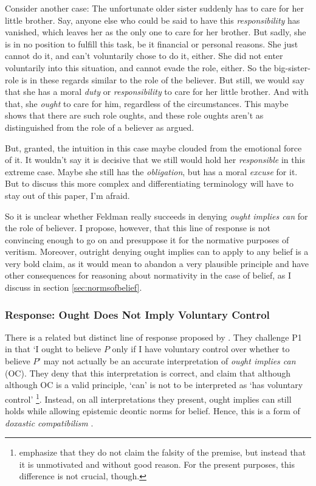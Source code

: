 \documentclass[12pt,numbers=noenddot]{scrartcl}
\begin{document}
Consider another case: The unfortunate older sister suddenly has to care for her little brother. Say, anyone else who could be said to have this \emph{responsibility} has vanished, which leaves her as the only one to care for her brother. But sadly, she is in no position to fulfill this task, be it financial or personal reasons. She just cannot do it, and can't voluntarily chose to do it, either. She did not enter voluntarily into this situation, and cannot evade the role, either. So the big-sister-role is in these regards similar to the role of the believer. But still, we would say that she has a moral \emph{duty} or \emph{responsibility} to care for her little brother. And with that, she \emph{ought} to care for him, regardless of the circumstances. This maybe shows that there are such role oughts, and these role oughts aren't as distinguished from the role of a believer as argued.

But, granted, the intuition in this case maybe clouded from the emotional force of it. It wouldn't say it is decisive that we still would hold her \emph{responsible} in this extreme case. Maybe she still has the \emph{obligation}, but has a moral \emph{excuse} for it. But to discuss this more complex and differentiating terminology will have to stay out of this paper, I'm afraid.

So it is unclear whether Feldman really succeeds in denying \emph{ought implies can} for the role of believer. I propose, however, that this line of response is not convincing enough to go on and presuppose it for the normative purposes of veritism. Moreover, outright denying ought implies can to apply to any belief is a very bold claim, as it would mean to abandon a very plausible principle and have other consequences for reasoning about normativity in the case of belief, as I discuss in section \ref{sec:normsofbelief}.

\subsubsection{Response: Ought Does Not Imply Voluntary Control}\label{sec:oughtdoesnot}

There is a related but distinct line of response proposed by \textcite{Chuard2009-CHUENW}. They challenge P1 in that ‘I ought to believe $P$ only if I have voluntary control over whether to believe $P$’ may not actually be an accurate interpretation of \emph{ought implies can} (OC). They deny that this interpretation is correct, and claim that although although OC is a valid principle, ‘can’ is not to be interpreted as ‘has voluntary control’
\footnote{\textcite[601]{Chuard2009-CHUENW} emphasize that they do not claim the falsity of the premise, but instead that it is unmotivated and without good reason. For the present purposes, this difference is not crucial, though.}.
Instead, on all interpretations they present, ought implies can still holds while allowing epistemic deontic norms for belief. Hence, this is a form of \emph{doxastic compatibilism} \autocite[682]{Peels2014-PEEADC}.
\end{document}
